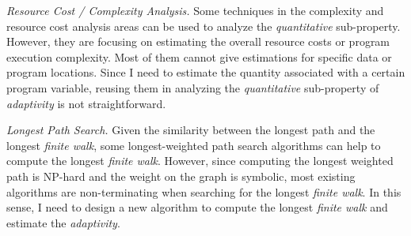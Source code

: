 \emph{Resource Cost / Complexity Analysis.}
Some techniques in the complexity and resource cost analysis areas can be used to analyze the \emph{quantitative} sub-property.
However, they are focusing on estimating the
overall resource costs or program execution complexity.
Most of them cannot give estimations for specific data or program locations.
Since I need to estimate the quantity associated with a certain program variable,
reusing them in analyzing the \emph{quantitative} sub-property of \emph{adaptivity} is not straightforward. 

\emph{Longest Path Search.}
Given the similarity between the longest path and the longest \emph{finite walk}, some longest-weighted path search algorithms
can help to compute the longest \emph{finite walk}.
However, since computing the longest weighted path is NP-hard
and the weight on the graph is symbolic,
most existing algorithms are non-terminating when searching for the longest \emph{finite walk}.
In this sense, I need to design a new algorithm to compute the longest \emph{finite walk} and estimate the \emph{adaptivity}.

